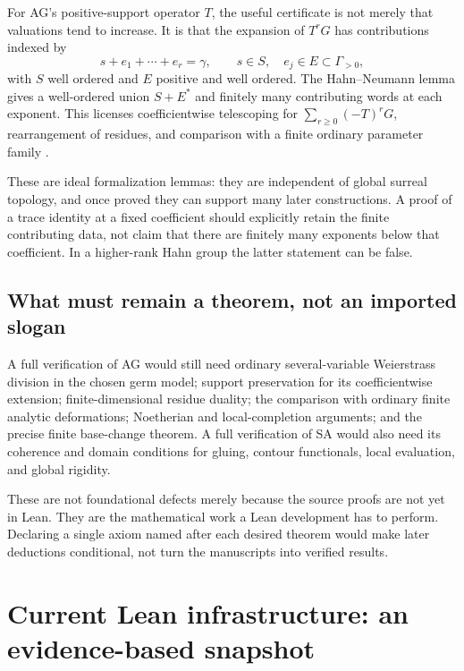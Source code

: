 \documentclass[11pt,letterpaper]{article}
\theoremstyle{definition}
\theoremstyle{remark}
\numberwithin{equation}{section}
\begin{document}
For AG's positive-support operator \(T\), the useful certificate is not merely that valuations tend to increase. It is that the expansion of \(T^rG\) has contributions indexed by
\[
 s+e_1+\cdots+e_r=\gamma,
 \qquad s\in S,\quad e_j\in E\subset\Gamma_{>0},
\]
with \(S\) well ordered and \(E\) positive and well ordered. The Hahn--Neumann lemma gives a well-ordered union \(S+E^*\) and finitely many contributing words at each exponent. This licenses coefficientwise telescoping for \(\sum_{r\ge0}(-T)^rG\), rearrangement of residues, and comparison with a finite ordinary parameter family \cite[\S\S2, 6--8]{AG}.

These are ideal formalization lemmas: they are independent of global surreal topology, and once proved they can support many later constructions. A proof of a trace identity at a fixed coefficient should explicitly retain the finite contributing data, not claim that there are finitely many exponents below that coefficient. In a higher-rank Hahn group the latter statement can be false.

\subsection{What must remain a theorem, not an imported slogan}
A full verification of AG would still need ordinary several-variable Weierstrass division in the chosen germ model; support preservation for its coefficientwise extension; finite-dimensional residue duality; the comparison with ordinary finite analytic deformations; Noetherian and local-completion arguments; and the precise finite base-change theorem. A full verification of SA would also need its coherence and domain conditions for gluing, contour functionals, local evaluation, and global rigidity.

These are not foundational defects merely because the source proofs are not yet in Lean. They are the mathematical work a Lean development has to perform. Declaring a single axiom named after each desired theorem would make later deductions conditional, not turn the manuscripts into verified results.

\section{Current Lean infrastructure: an evidence-based snapshot}\label{sec:lean-snapshot}
\end{document}
